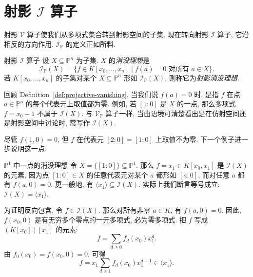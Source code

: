 \section{\texorpdfstring{射影 $\mathcal{I}$ 算子}{射影 I 算子}}\label{sec:projective-ideal-operator}

射影 $\mathcal{V}$ 算子使我们从多项式集合转到射影空间的子集. 现在转向射影 $\mathcal{I}$ 算子, 它沿相反的方向作用. $\mathcal{I}_{\mathbb{P}}$ 的定义正如所料.

\begin{Definition}{射影 $\mathcal{I}$ 算子}\leavevmode\label{def:projective-ideal-operator}
设 $X\subseteq\mathbb{P}^{n}$ 为子集. $X$ 的\emph{消没理想}是
\[
  \mathcal{I}_{\mathbb{P}}(X)=
    \{f\in K[x_{0},\ldots,x_{n}]\mid f(a)=0\text{ 对所有 }a\in X\}.
\]
若 $K[x_{0},\ldots,x_{n}]$ 的子集对某个 $X\subseteq\mathbb{P}^{n}$ 形如 $\mathcal{I}_{\mathbb{P}}(X)$, 则称它为\emph{射影消没理想}.
\end{Definition}

\begin{BookFlowNote}[l]{%
回顾 Definition~\ref{def:projective-vanishing}, 当我们说 $f(a)=0$ 时, 是指 $f$ 在点 $a\in\mathbb{P}^{n}$ 的每个代表元上取值都为零. 例如, 若 $[1:0]$ 是 $X$ 的一点, 那么多项式 $f=x_{0}-1$ 不属于 $\mathcal{I}(X)$.
}
\noindent 与 $\mathcal{V}_{\mathbb{P}}$ 算子一样, 当由语境可清楚看出是在仿射空间还是射影空间中讨论时, 常写作 $\mathcal{I}(X)$.

尽管 $f(1,0)=0$, 但 $f$ 在代表元 $[2:0]=[1:0]$ 上取值不为零. 下一个例子进一步说明这一点.
\end{BookFlowNote}

\begin{Example}{$\mathbb{P}^{1}$ 中一点的消没理想}\leavevmode\label{ex:vanishing-ideal-of-point-in-projective-line}
令 $X=\{[1:0]\}\subseteq\mathbb{P}^{1}$. 那么 $f=x_{1}\in K[x_{0},x_{1}]$ 是 $\mathcal{I}(X)$ 的元素, 因为点 $[1:0]\in X$ 的任意代表元对某个 $a$ 都形如 $[a:0]$, 而对任意 $a$ 都有 $f(a,0)=0$. 更一般地, 有 $\langle x_{1}\rangle\subseteq\mathcal{I}(X)$. 实际上我们断言等号成立: $\mathcal{I}(X)=\langle x_{1}\rangle$.

为证明反向包含, 令 $f\in\mathcal{I}(X)$. 那么对所有非零 $a\in K$, 有 $f(a,0)=0$. 因此, $f(x_{0},0)$ 是有无穷多个零点的一元多项式, 必为零多项式. 把 $f$ 写成 $(K[x_{0}])[x_{1}]$ 的元素:
\[
  f=\sum_{d\geq0}f_{d}(x_{0})x_{1}^{d}.
\]
由 $f_{0}(x_{0})=f(x_{0},0)=0$, 可得
\[
  f=x_{1}\sum_{d\geq1}f_{d}(x_{0})x_{1}^{d-1}\in\langle x_{1}\rangle.
\]
\end{Example}

